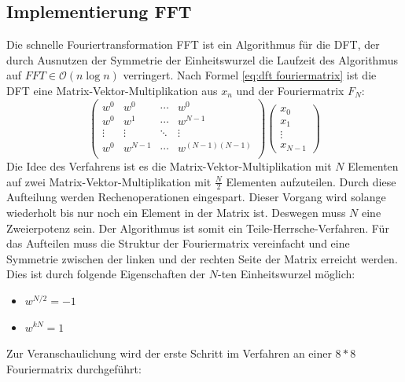 \subsection{Implementierung FFT}
Die schnelle Fouriertransformation FFT ist ein Algorithmus für die DFT, der durch Ausnutzen der Symmetrie der Einheitswurzel die Laufzeit des Algorithmus auf $FFT \in \mathcal O(n \log n)$ verringert.
\newline
Nach Formel \ref{eq:dft fouriermatrix} ist die DFT eine Matrix-Vektor-Multiplikation aus $x_{n}$ und der Fouriermatrix $F_{N}$:
\begin{equation}
\left( \begin{array}{cccc}
w^0 & w^0 & \cdots & w^0\\
w^0 & w^1 & \cdots & w^{N-1}\\
\vdots & \vdots & \ddots & \vdots\\
w^0 & w^{N-1} & \cdots & w^{(N-1)(N-1)}\\
\end{array}\right)
\left( \begin{array}{c}
x_0\\
x_1\\
\vdots\\
x_{N-1}
\end{array}\right)
\end{equation}
Die Idee des Verfahrens ist es die Matrix-Vektor-Multiplikation mit $N$ Elementen auf zwei Matrix-Vektor-Multiplikation mit $\frac{N}{2}$ Elementen aufzuteilen. Durch diese Aufteilung werden Rechenoperationen eingespart. Dieser Vorgang wird solange wiederholt bis nur noch ein Element in der Matrix ist. Deswegen muss $N$ eine Zweierpotenz sein. Der Algorithmus ist somit ein Teile-Herrsche-Verfahren.
Für das Aufteilen muss die Struktur der Fouriermatrix vereinfacht und eine Symmetrie zwischen der linken und der rechten Seite der Matrix erreicht werden. Dies ist durch folgende Eigenschaften der $N$-ten Einheitswurzel möglich:
\begin{itemize}
\item $w^{N/2} = -1$ 
\item $w^{kN} = 1$
\end{itemize}
Zur Veranschaulichung wird der erste Schritt im Verfahren an einer $8*8$ Fouriermatrix durchgeführt:
